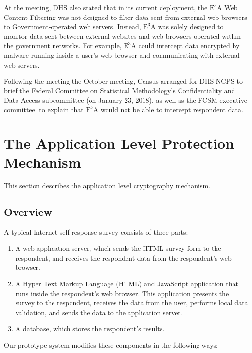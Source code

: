 \documentclass[fleqn,10pt]{wlscirep}
\newcommand{\ETA}{$\textrm{E}^\textrm{3}\textrm{A}$\xspace}
\begin{document}
At the meeting, DHS also stated that in its current deployment, the \ETA Web Content Filtering
was not designed to filter data sent from external web browsers to
Government-operated web servers. Instead, \ETA was solely designed to
monitor data sent between external websites and web browsers operated
within the government networks. For example, \ETA could intercept data
encrypted by malware running inside a user's web browser and
communicating with external web servers.

Following the meeting the October meeting, Census arranged for DHS
NCPS to brief the Federal Committee on Statistical Methodology's
Confidentiality and Data Access subcommittee (on January 23, 2018), as
well as the FCSM executive committee, to explain that \ETA would not
be able to intercept respondent data.



\section{The Application Level Protection Mechanism}

This section describes the application level cryptography mechanism.

\subsection{Overview}

A typical Internet self-response survey consists of three parts:

\begin{enumerate}
  \item A web application server, which sends the HTML survey form to
    the respondent, and receives the respondent data from the
    respondent's web browser.
  \item A Hyper Text Markup Language (HTML) and JavaScript application
    that runs inside the respondent's web browser. This application
    presents the survey to the respondent, receives the data from the user, performs
    local data validation, and sends the data to the application
    server.
  \item A database, which stores the respondent's results. 
\end{enumerate}

Our prototype system modifies these components in the following ways:
\end{document}

